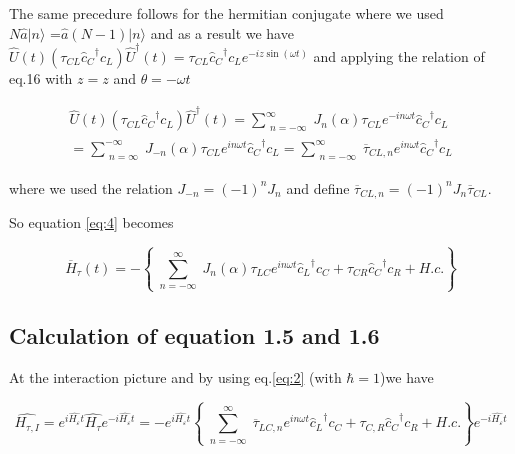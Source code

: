 The same precedure follows for the hermitian conjugate where we used \\
$N{\widehat{a}} \vert n \rangle $ =$ {\widehat{a}}(N - 1)\vert n \rangle$ and as a result  we have \\
$\widehat{U}(t)( \tau_{CL}{\widehat{c}_{C}}^{\dagger} c_{L} ){\widehat{U}}^{\dagger}(t) = \tau_{CL}{\widehat{c}_{C}}^{\dagger} c_{L} e^{-iz\sin(\omega t)}$ and applying the relation of eq.16 with $z=  z$ and $\theta=-\omega t$ 

\begin{multline} \label{eq:17}
\widehat{U}(t)( \tau_{CL}{\widehat{c}_{C}}^{\dagger} c_{L} ){\widehat{U}}^{\dagger}(t) = \sum_{\substack{n={-\infty}}}^\infty J_n (\alpha) \tau_{CL} e^{- i n \omega t} {\widehat{c}_{C}}^{\dagger} c_{L} 
\\
=\sum_{\substack{n={\infty}}}^{-\infty} J_{-n} (\alpha) \tau_{CL} e^{ i n \omega t} {\widehat{c}_{C}}^{\dagger} c_{L} = \sum_{\substack{n=-\infty}}^{\infty} \overline{\tau}_{CL,n} e^{ i n \omega t} {\widehat{c}_{C}}^{\dagger} c_{L} 
\end{multline}

where we used the relation $ J_{-n}=(-1)^n J_n$ and define $\overline{\tau}_{CL,n}= (-1)^n J_n \overline{\tau}_{CL}$.

So equation \ref{eq:4} becomes 

\begin{equation} \label{eq:18}
\widehat{\overline{H}}_{\tau}(t) = - \left\lbrace  \sum_{\substack{n={-\infty}}}^\infty J_n (\alpha) \tau_{LC} e^{i n \omega t} {\widehat{c}_{L}}^{\dagger} c_{C} + \tau_{CR}{\widehat{c}_{C}}^{\dagger} c_{R} + H.c. \right\rbrace 
\end{equation}

\subsection{Calculation of equation 1.5 and 1.6}  \label{subsection1.1.2}

At the interaction picture and by using eq.\ref{eq:2} (with $\hbar=1$)we have 

\begin{equation} \label{eq:19}
\widehat{H_{\tau,I}}= e^{i\widehat{H_{\varepsilon}}t} \widehat{H_{\tau}} e^{-i\widehat{H_{\varepsilon}}t} = - e^{i\widehat{H_{\varepsilon}}t} \left\lbrace  \sum_{\substack{n={-\infty}}}^\infty \overline{\tau}_{LC,n} e^{i n \omega t} {\widehat{c}_{L}}^{\dagger} c_{C} + \tau_{C,R}{\widehat{c}_{C}}^{\dagger} c_{R} + H.c. \right\rbrace   e^{-i\widehat{H_{\varepsilon}}t} 
\end{equation}

